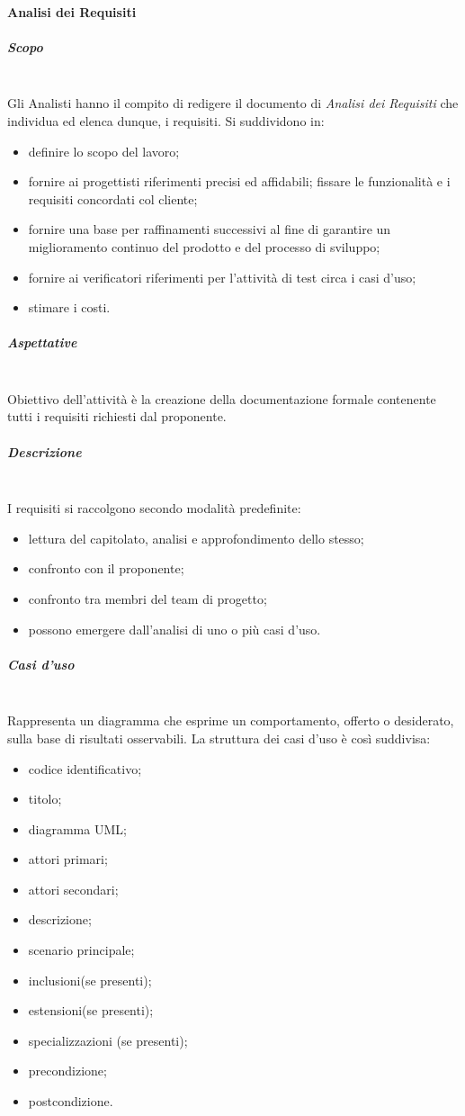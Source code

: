 		\paragraph{Analisi dei Requisiti}
			\subparagraph{Scopo} \mbox{}\\
			Gli Analisti hanno il compito di redigere il documento di
			\textit{Analisi dei Requisiti} che individua ed elenca dunque, i requisiti.
			Si suddividono in:
			\begin{itemize}
				\item definire lo scopo del lavoro;
				\item fornire ai progettisti riferimenti precisi ed affidabili;
				fissare le funzionalità e i requisiti concordati col cliente;
				\item fornire  una  base  per  raffinamenti  successivi  al  fine  di  garantire  un miglioramento continuo del prodotto e del processo di sviluppo;
				\item fornire ai verificatori riferimenti per l'attività di test circa i casi d'uso;
				\item stimare i costi.
			\end{itemize}
			\subparagraph{Aspettative} \mbox{}\\
			Obiettivo dell'attività è la creazione della documentazione formale contenente tutti i
			requisiti richiesti dal proponente.
			\subparagraph{Descrizione} \mbox{}\\
			I requisiti si raccolgono secondo modalità predefinite:
			\begin{itemize}
				\item lettura del capitolato, analisi e approfondimento dello stesso;
				\item confronto con il proponente;
				\item confronto tra membri del team di progetto;
				\item possono emergere dall'analisi di uno o più casi d'uso.
			\end{itemize}
			\subparagraph{Casi d'uso} \mbox{}\\
			Rappresenta un diagramma che esprime un comportamento,
			offerto o desiderato, sulla base di risultati osservabili.
			La struttura dei casi d'uso è così suddivisa:
			\begin{itemize}
				\item codice identificativo;
				\item titolo;
				\item diagramma UML;
				\item attori primari;
				\item attori secondari;
				\item descrizione;
				\item scenario principale;
				\item inclusioni(se presenti);
				\item estensioni(se presenti);
				\item specializzazioni (se presenti);
				\item precondizione;
				\item postcondizione.
			\end{itemize}
